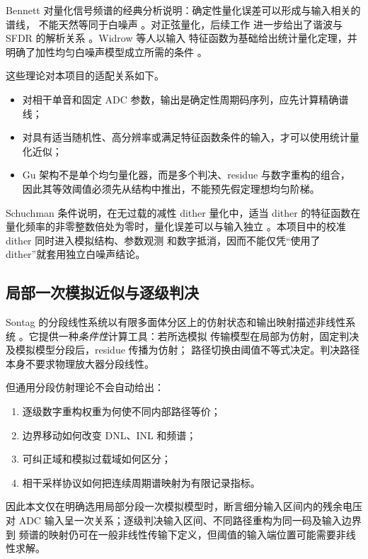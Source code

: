 \documentclass[11pt,a4paper]{ctexart}
\theoremstyle{adcplain}
\theoremstyle{definition}
\begin{document}
Bennett 对量化信号频谱的经典分析说明：确定性量化误差可以形成与输入相关的谱线，
不能天然等同于白噪声 \cite{Bennett1948QuantizedSpectra}。对正弦量化，后续工作
进一步给出了谐波与 SFDR 的解析关系
\cite{Blachman1985QuantizedSinusoids,OudeAlink2009SFDR}。Widrow 等人以输入
特征函数为基础给出统计量化定理，并明确了加性均匀白噪声模型成立所需的条件
\cite{Widrow1996StatisticalQuantization,Gray1998Quantization}。

这些理论对本项目的适配关系如下。

\begin{itemize}
  \item 对相干单音和固定 ADC 参数，输出是确定性周期码序列，应先计算精确谱线；
  \item 对具有适当随机性、高分辨率或满足特征函数条件的输入，才可以使用统计量化近似；
  \item Gu 架构不是单个均匀量化器，而是多个判决、residue 与数字重构的组合，
        因此其等效阈值必须先从结构中推出，不能预先假定理想均匀阶梯。
\end{itemize}

Schuchman 条件说明，在无过载的减性 dither 量化中，适当 dither 的特征函数在
量化频率的非零整数倍处为零时，量化误差可以与输入独立
\cite{Schuchman1964Dither}。本项目中的校准 dither 同时进入模拟结构、参数观测
和数字抵消，因而不能仅凭“使用了 dither”就套用独立白噪声结论。

\subsection{局部一次模拟近似与逐级判决}

Sontag 的分段线性系统以有限多面体分区上的仿射状态和输出映射描述非线性系统
\cite{Sontag1981PiecewiseLinear}。它提供一种\emph{条件性}计算工具：若所选模拟
传输模型在局部为仿射，固定判决及模拟模型分段后，residue 传播为仿射；
路径切换由阈值不等式决定。判决路径本身不要求物理放大器分段线性。

但通用分段仿射理论不会自动给出：

\begin{enumerate}
  \item 逐级数字重构权重为何使不同内部路径等价；
  \item 边界移动如何改变 DNL、INL 和频谱；
  \item 可纠正域和模拟过载域如何区分；
  \item 相干采样协议如何把连续周期谱映射为有限记录指标。
\end{enumerate}

因此本文仅在明确选用局部分段一次模拟模型时，断言细分输入区间内的残余电压
对 ADC 输入呈一次关系；逐级判决输入区间、不同路径重构为同一码及输入边界到
频谱的映射仍可在一般非线性传输下定义，但阈值的输入端位置可能需要非线性求解。
\end{document}
